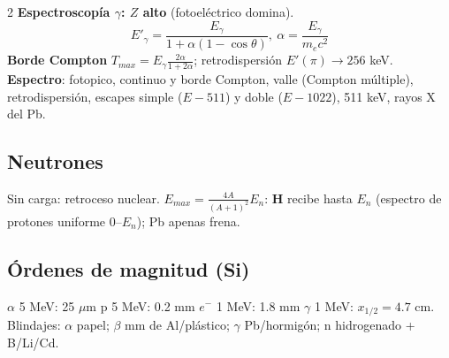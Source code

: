 \documentclass[10pt,a4paper]{article}
\newcommand{\imp}[1]{\textbf{\color{BrickRed}#1}}
\begin{document}
\begin{multicols}{2}
\imp{Espectroscopía $\gamma$: $Z$ alto} (fotoeléctrico domina).
\[ E'_\gamma=\frac{E_\gamma}{1+\alpha(1-\cos\theta)},\ \alpha=\frac{E_\gamma}{m_ec^2} \]
\textbf{Borde Compton} $T_{max}=E_\gamma\frac{2\alpha}{1+2\alpha}$; retrodispersión $E'(\pi)\to256$ keV.
\textbf{Espectro}: fotopico, continuo y borde Compton, valle (Compton múltiple), retrodispersión, escapes simple ($E-511$) y doble ($E-1022$), 511 keV, rayos X del Pb.
\subsection{Neutrones}
Sin carga: retroceso nuclear. $E_{max}=\frac{4A}{(A+1)^2}E_n$: \textbf{H} recibe hasta $E_n$ (espectro de protones uniforme $0$--$E_n$); Pb apenas frena.
\subsection{Órdenes de magnitud (Si)}
$\alpha$ 5 MeV: 25 $\mu$m \textperiodcentered{} p 5 MeV: 0.2 mm \textperiodcentered{} $e^-$ 1 MeV: 1.8 mm \textperiodcentered{} $\gamma$ 1 MeV: $x_{1/2}=4.7$ cm.
Blindajes: $\alpha$ papel; $\beta$ mm de Al/plástico; $\gamma$ Pb/hormigón; n hidrogenado + B/Li/Cd.
\end{multicols}
\newpage

\end{document}
